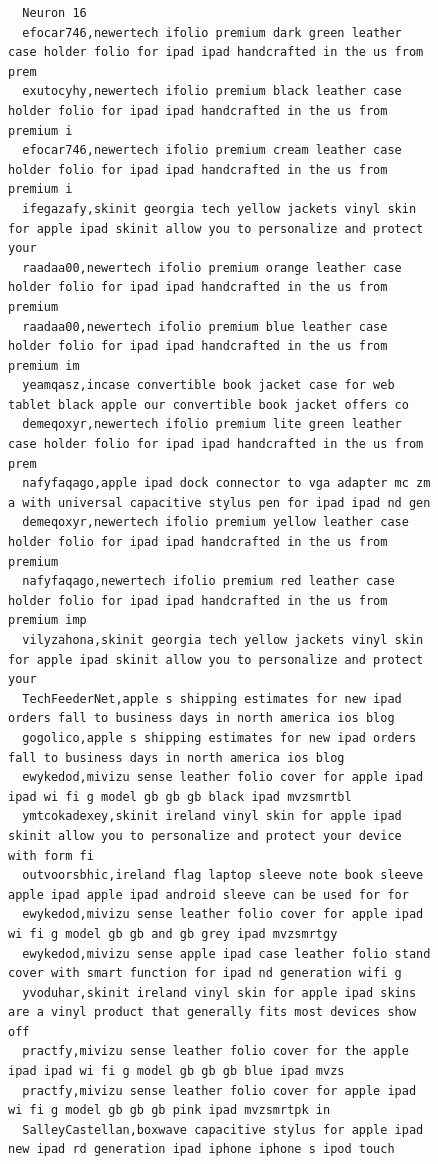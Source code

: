 \begin{figure}[htpb]
\begin{verbatim}
  Neuron 16
  efocar746,newertech ifolio premium dark green leather case holder folio for ipad ipad handcrafted in the us from prem
  exutocyhy,newertech ifolio premium black leather case holder folio for ipad ipad handcrafted in the us from premium i
  efocar746,newertech ifolio premium cream leather case holder folio for ipad ipad handcrafted in the us from premium i
  ifegazafy,skinit georgia tech yellow jackets vinyl skin for apple ipad skinit allow you to personalize and protect your
  raadaa00,newertech ifolio premium orange leather case holder folio for ipad ipad handcrafted in the us from premium
  raadaa00,newertech ifolio premium blue leather case holder folio for ipad ipad handcrafted in the us from premium im
  yeamqasz,incase convertible book jacket case for web tablet black apple our convertible book jacket offers co
  demeqoxyr,newertech ifolio premium lite green leather case holder folio for ipad ipad handcrafted in the us from prem
  nafyfaqago,apple ipad dock connector to vga adapter mc zm a with universal capacitive stylus pen for ipad ipad nd gen
  demeqoxyr,newertech ifolio premium yellow leather case holder folio for ipad ipad handcrafted in the us from premium
  nafyfaqago,newertech ifolio premium red leather case holder folio for ipad ipad handcrafted in the us from premium imp
  vilyzahona,skinit georgia tech yellow jackets vinyl skin for apple ipad skinit allow you to personalize and protect your
  TechFeederNet,apple s shipping estimates for new ipad orders fall to business days in north america ios blog
  gogolico,apple s shipping estimates for new ipad orders fall to business days in north america ios blog
  ewykedod,mivizu sense leather folio cover for apple ipad ipad wi fi g model gb gb gb black ipad mvzsmrtbl
  ymtcokadexey,skinit ireland vinyl skin for apple ipad skinit allow you to personalize and protect your device with form fi
  outvoorsbhic,ireland flag laptop sleeve note book sleeve apple ipad apple ipad android sleeve can be used for for
  ewykedod,mivizu sense leather folio cover for apple ipad wi fi g model gb gb and gb grey ipad mvzsmrtgy
  ewykedod,mivizu sense apple ipad case leather folio stand cover with smart function for ipad nd generation wifi g
  yvoduhar,skinit ireland vinyl skin for apple ipad skins are a vinyl product that generally fits most devices show off
  practfy,mivizu sense leather folio cover for the apple ipad ipad wi fi g model gb gb gb blue ipad mvzs
  practfy,mivizu sense leather folio cover for apple ipad wi fi g model gb gb gb pink ipad mvzsmrtpk in
  SalleyCastellan,boxwave capacitive stylus for apple ipad new ipad rd generation ipad iphone iphone s ipod touch

\end{verbatim}
\end{figure}
